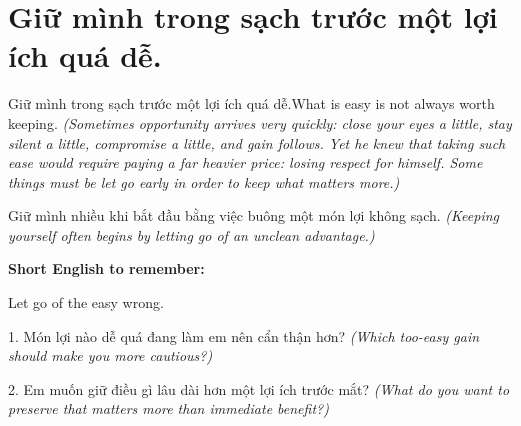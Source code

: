 \section{Giữ mình trong sạch trước một lợi ích quá dễ.}
\begin{truyen}{Giữ mình trong sạch trước một lợi ích quá dễ.}{What is easy is not always worth keeping.}
\textit{(Sometimes opportunity arrives very quickly: close your eyes a little, stay silent a little, compromise a little, and gain follows. Yet he knew that taking such ease would require paying a far heavier price: losing respect for himself. Some things must be let go early in order to keep what matters more.)}
\end{truyen}
\begin{baihoc}
Giữ mình nhiều khi bắt đầu bằng việc buông một món lợi không sạch.
\textit{(Keeping yourself often begins by letting go of an unclean advantage.)}
\end{baihoc}
\begin{ghinhoanh}
\textbf{Short English to remember:}

Let go of the easy wrong.
\end{ghinhoanh}
\begin{tuhocnhanh}
1. Món lợi nào dễ quá đang làm em nên cẩn thận hơn? \textit{(Which too-easy gain should make you more cautious?)}

2. Em muốn giữ điều gì lâu dài hơn một lợi ích trước mắt? \textit{(What do you want to preserve that matters more than immediate benefit?)}
\end{tuhocnhanh}
\ngancach
